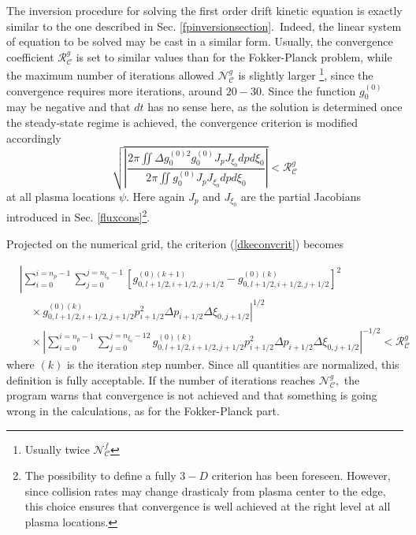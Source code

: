 

The inversion procedure for solving the first order drift kinetic equation
is exactly similar to the one described in Sec. \ref{fpinversionsection}.\
Indeed, the linear system of equation to be solved may be cast in a similar
form. Usually, the convergence coefficient $\mathcal{R}_{\mathcal{C}}^{g}$
is set to similar values than for the Fokker-Planck problem, while the
maximum number of iterations allowed $\mathcal{N}_{\mathcal{C}}^{g}$ is
slightly larger \footnote{%
Usually twice $\mathcal{N}_{\mathcal{C}}^{f}$}, since the convergence
requires more iterations, around $20-30$. Since the function $g_{0}^{\left(
0\right) }$ may be negative and that $dt$ has no sense here, as the solution
is determined once the steady-state regime is achieved, the convergence
criterion is modified accordingly
\begin{equation}
\sqrt{\left| \frac{2\pi \iint \Delta g_{0}^{\left( 0\right) 2}g_{0}^{\left(
0\right) }J_{p}J_{\xi _{0}}dpd\xi _{0}}{2\pi \iint g_{0}^{\left( 0\right)
}J_{p}J_{\xi _{0}}dpd\xi _{0}}\right| }<\mathcal{R}_{\mathcal{C}}^{g}
\label{dkeconvcrit}
\end{equation}
at all plasma locations $\psi .$ Here again $J_{p}$ and $J_{\xi _{0}}$ are
the partial Jacobians introduced in Sec. \ref{fluxcons}\footnote{%
The possibility to define a fully $3-D$ criterion has been foreseen.
However, since collision rates may change drasticaly from plasma center to
the edge, this choice ensures that convergence is well achieved at the right
level at all plasma locations. }.

Projected on the numerical grid, the criterion (\ref{dkeconvcrit}) becomes

\begin{align}
&\left| \sum_{i=0}^{i=n_{p}-1}\sum_{j=0}^{j=n_{\xi _{0}}-1}\left[
g_{0,l+1/2,i+1/2,j+1/2}^{\left( 0\right) \left( k+1\right)
}-g_{0,l+1/2,i+1/2,j+1/2}^{\left( 0\right) \left( k\right)
}\right]
^{2}\right.\nonumber\\&\left.\quad\times g_{0,l+1/2,i+1/2,j+1/2}^{\left( 0\right) \left( k\right) }p_{i+1/2}^{2}%
\Delta p_{i+1/2}\Delta \xi
_{0,j+1/2}\right|^{1/2}\nonumber\\&\quad\times\left|
\sum_{i=0}^{i=n_{p}-1}%
\sum_{j=0}^{j=n_{\xi _{0}}-12}g_{0,l+1/2,i+1/2,j+1/2}^{\left( 0\right)
\left( k\right) }p_{i+1/2}^{2}\Delta p_{i+1/2}\Delta \xi _{0,j+1/2}\right|^{-1/2} %
<\mathcal{R}_{\mathcal{C}}^{g}
\end{align}
where $\left( k\right) $ is the iteration step number. Since all
quantities are normalized, this definition is fully acceptable. If
the number of iterations reaches $\mathcal{N}_{\mathcal{C}}^{g},$
the program warns that convergence is not achieved and that
something is going wrong in the calculations, as for the
Fokker-Planck part.
